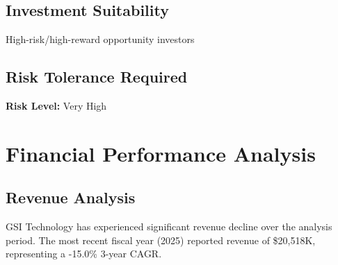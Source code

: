 \documentclass[11pt,a4paper]{article}
\begin{document}
\vspace{0.3cm}

\subsection{Investment Suitability}

\noindent High-risk/high-reward opportunity investors

\vspace{0.3cm}

\subsection{Risk Tolerance Required}

\noindent \textbf{Risk Level:} Very High


\newpage

\section{Financial Performance Analysis}

\subsection{Revenue Analysis}

GSI Technology has experienced significant revenue decline over the analysis period. The most recent fiscal year (2025) reported revenue of \$20,518K, representing a -15.0\% 3-year CAGR.


\begin{table}[H]
\centering
\caption{Revenue Growth Metrics (Recent 8 Years)}
\label{tab:revenue_growth}
\end{table}
\end{document}
